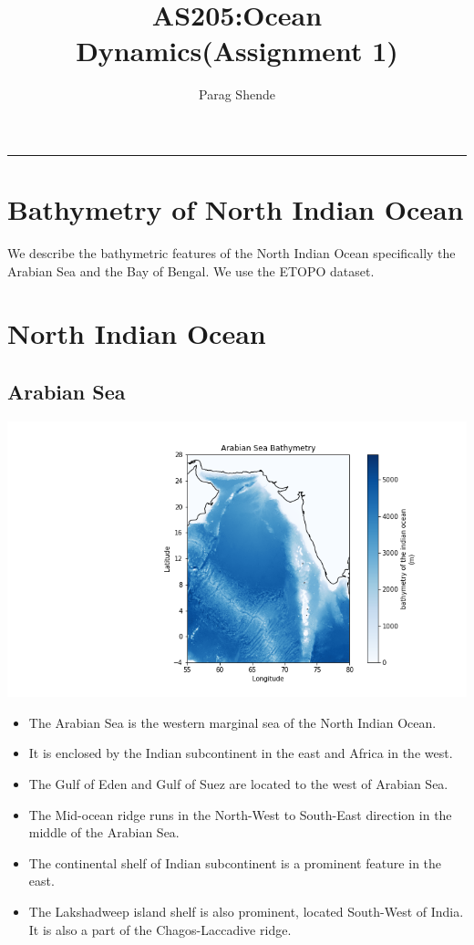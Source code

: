 \documentclass[16pt]{article}
\title{AS205:Ocean Dynamics(Assignment 1)}
\author{Parag Shende}
\begin{document}
\maketitle
\hrule

\section{Bathymetry of North Indian Ocean}

We describe the bathymetric features of the North Indian Ocean specifically 
the Arabian Sea and the Bay of Bengal. We use the ETOPO dataset.

\section{North Indian Ocean}

\subsection{Arabian Sea}

\begin{center}
    \includegraphics[width=1.0\textwidth]{Arabian_Sea_Bathymetry.png}
\end{center}

\begin{itemize}
\item The Arabian Sea is the western marginal sea of the North Indian Ocean.
\item It is enclosed by the Indian subcontinent in the east and Africa in the west. 
\item The Gulf of Eden and Gulf of Suez are located to the west of Arabian Sea.
\item The Mid-ocean ridge runs in the North-West to South-East direction in the middle of the Arabian Sea.
\item The continental shelf of Indian subcontinent is a prominent feature in the east.
\item The Lakshadweep island shelf is also prominent, located South-West of India. It is also a part of the Chagos-Laccadive ridge.
\end{itemize}
\end{document}
